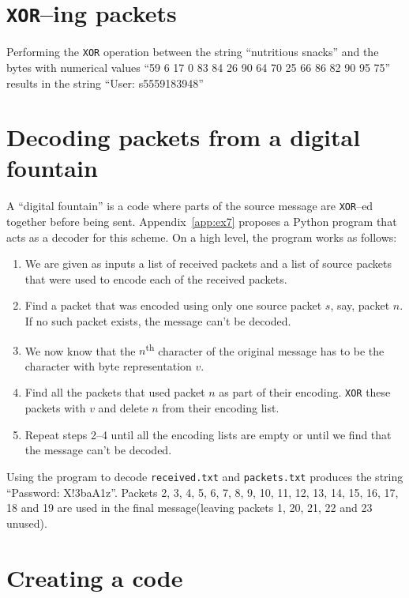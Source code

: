 \documentclass[10pt,a4paper,oneside,onecolumn]{article}
\newcommand*{\receivedTXT}{{\tt received.txt}\xspace}
\newcommand*{\packetsTXT}{{\tt packets.txt}\xspace}
\newcommand*{\XOR}{{\tt XOR}\xspace}
\begin{document}
\section{\XOR--ing packets}\label{sec:ex6}

Performing the \XOR operation between the string ``nutritious snacks'' and the
bytes with numerical values ``59 6 17 0 83 84 26 90 64 70 25 66 86 82 90 95 75''
results in the string ``User: s5559183948''


\section{Decoding packets from a digital fountain}\label{sec:ex7}

A ``digital fountain'' is a code where parts of the source message are \XOR--ed
together before being sent. Appendix~\ref{app:ex7} proposes a Python program
that acts as a decoder for this scheme. On a high level, the program works as
follows:

\begin{enumerate}
\item We are given as inputs a list of received packets and a list of source
      packets that were used to encode each of the received packets.
\item Find a packet that was encoded using only one source packet $s$, say,
      packet $n$.  If no such packet exists, the message can't be decoded.
\item We now know that the $n$\textsuperscript{th} character of the original
      message has to be the character with byte representation $v$.
\item Find all the packets that used packet $n$ as part of their encoding.
      \XOR these packets with $v$ and delete $n$ from their encoding list.
\item Repeat steps 2--4 until all the encoding lists are empty or until we find
      that the message can't be decoded.
\end{enumerate}

Using the program to decode \receivedTXT and \packetsTXT produces the string
``Password: X!3baA1z''. Packets 2, 3, 4, 5, 6, 7, 8, 9, 10, 11, 12, 13, 14, 15,
16, 17, 18 and 19 are used in the final message(leaving packets 1, 20, 21, 22
and 23 unused).


\section{Creating a code}\label{sec:ex8}
\end{document}
